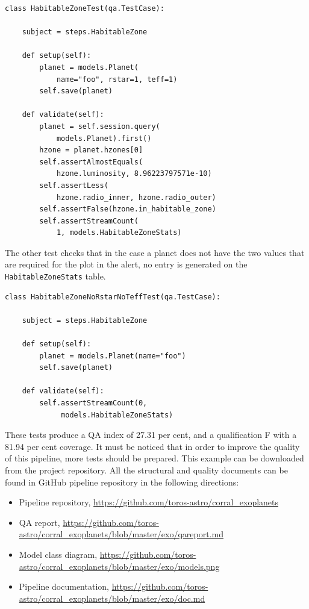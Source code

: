 \documentclass[final,5p,times,twocolumn,authoryear]{elsarticle}
\begin{document}
\begin{verbatim}
class HabitableZoneTest(qa.TestCase):

    subject = steps.HabitableZone

    def setup(self):
        planet = models.Planet(
            name="foo", rstar=1, teff=1)
        self.save(planet)

    def validate(self):
        planet = self.session.query(
            models.Planet).first()
        hzone = planet.hzones[0]
        self.assertAlmostEquals(
            hzone.luminosity, 8.96223797571e-10)
        self.assertLess(
            hzone.radio_inner, hzone.radio_outer)
        self.assertFalse(hzone.in_habitable_zone)
        self.assertStreamCount(
            1, models.HabitableZoneStats)
\end{verbatim}

The other test checks that in the case a planet does not have the two values that are
required for the plot in the alert, no entry is generated on the \verb|HabitableZoneStats| table.

\begin{verbatim}
class HabitableZoneNoRstarNoTeffTest(qa.TestCase):

    subject = steps.HabitableZone

    def setup(self):
        planet = models.Planet(name="foo")
        self.save(planet)

    def validate(self):
        self.assertStreamCount(0,
             models.HabitableZoneStats)
\end{verbatim}

These tests produce a QA index of 27.31 per cent, and a qualification F with a 81.94 per cent coverage.
%
It must be noticed that in order to improve the quality of this pipeline, more tests should be prepared.
%
This example can be downloaded from the project
repository.
%
All the structural and quality documents can be found in GitHub pipeline repository
in the following directions:

\begin{itemize}
\item Pipeline repository, \url{https://github.com/toros-astro/corral_exoplanets}
\item QA report, \url{https://github.com/toros-astro/corral_exoplanets/blob/master/exo/qareport.md}
\item Model class diagram, \url{https://github.com/toros-astro/corral_exoplanets/blob/master/exo/models.png}
\item Pipeline documentation, \url{https://github.com/toros-astro/corral_exoplanets/blob/master/exo/doc.md}
\end{itemize}
\end{document}
